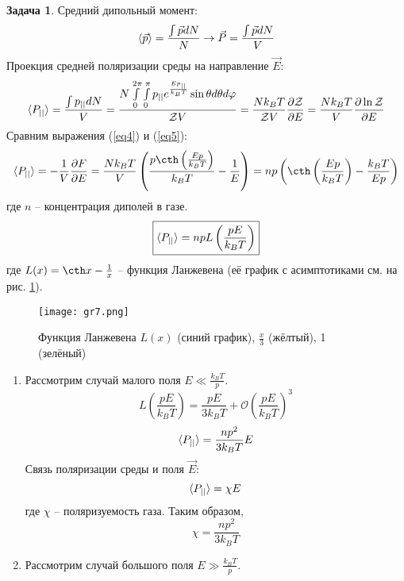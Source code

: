 \documentclass[12pt]{article}
\theoremstyle{definition}
\newtheorem{zad}{Задача}[section]
\begin{document}
\begin{zad}
Средний дипольный момент:
\begin{equation}
    \braket{\vec{p}}=\frac{\int\vec{p}dN}{N}\rightarrow\vec{P}=\frac{\int\vec{p}dN}{V}
\end{equation}
Проекция средней поляризации среды на направление $\vec{E}$:
\begin{equation}\label{eq5}
    \braket{P_{||}}=\frac{\int p_{||}dN}{V}=\frac{N\int\limits_0^{2\pi}\int\limits_0^\pi p_{||}e^{\frac{Ep_{||}}{k_BT}}\sin\theta d\theta d\varphi}{\mathcal{Z}V}=\frac{Nk_BT}{\mathcal{Z}V}\frac{\partial\mathcal{Z}}{\partial E}=\frac{Nk_BT}{V}\frac{\partial\ln\mathcal{Z}}{\partial E}
\end{equation}
Сравним выражения (\ref{eq4}) и (\ref{eq5}):
\begin{equation}
    \braket{P_{||}}=-\frac{1}{V}\frac{\partial F}{\partial E}=\frac{Nk_BT}{V}\left(\frac{p\cth\left(\frac{Ep}{k_BT}\right)}{k_BT}-\frac{1}{E}\right)=np\left(\cth\left(\frac{Ep}{k_BT}\right)-\frac{k_BT}{Ep}\right)
\end{equation}
где $n$ -- концентрация диполей в газе.
\begin{equation}
    \boxed{\braket{P_{||}}=npL\left(\frac{pE}{k_BT}\right)}
\end{equation}
где $L(x)=\cth x-\frac{1}{x}$ -- функция Ланжевена (её график с асимптотиками см. на рис. \ref{gr7}).
\begin{figure}[h!]
    \centering
    \texttt{[image: gr7.png]}
    \caption{Функция Ланжевена $L(x)$ (синий график), $\frac{x}{3}$ (жёлтый), 1 (зелёный)}
    \label{gr7}
\end{figure}
\begin{enumerate}
\item Рассмотрим случай малого поля $E\ll\frac{k_BT}{p}$.
\begin{equation}
    L\left(\frac{pE}{k_BT}\right)=\frac{pE}{3k_BT}+\mathcal{O}\left(\frac{pE}{k_BT}\right)^3
\end{equation}
\begin{equation}
    \braket{P_{||}}=\frac{np^2}{3k_BT}E
\end{equation}
Связь поляризации среды и поля $\vec{E}$:
\begin{equation}
    \braket{P_{||}}=\chi E
\end{equation}
где $\chi$ -- поляризуемость газа. Таким образом,
\begin{equation}
    \boxed{\chi=\frac{np^2}{3k_BT}}
\end{equation}
\item Рассмотрим случай большого поля $E\gg\frac{k_BT}{p}$.

\end{enumerate}
\end{zad}
\end{document}
